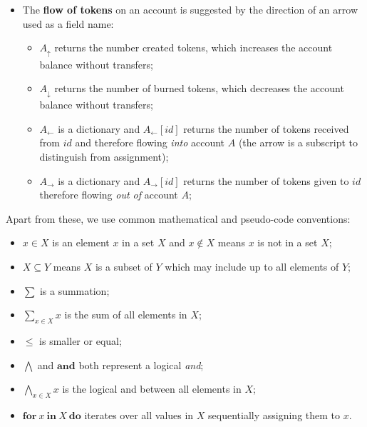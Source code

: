 \documentclass[9pt, oneside]{article}   	%
\begin{document}
\begin{itemize}
	\item The  \textbf{flow of tokens} on an account is suggested by the direction of an arrow used as a field name: 
		\begin{itemize}
			\item $A_\uparrow$ returns the number created tokens, which increases the account balance without transfers;
			\item $A_\downarrow$ returns the number of burned tokens, which decreases the account balance without transfers;
			\item $A_{\leftarrow}$ is a dictionary and $A_{\leftarrow}[id]$ returns the number of tokens received from $id$ and therefore flowing \textit{into} account $A$ (the arrow is a subscript to distinguish from assignment);
			\item $A_{\rightarrow}$ is a dictionary and $A_{\rightarrow}[id]$ returns the number of tokens given to $id$ therefore flowing \textit{out of} account $A$;
		\end{itemize}
\end{itemize}

Apart from these, we use common mathematical and pseudo-code conventions: 
\begin{itemize}
	\item $x \in X$ is an element $x$ in a set $X$ and $x \notin X$ means $x$ is not in a set $X$;
	\item $X \subseteq Y$ means $X$ is a subset of $Y$ which may include up to all elements of $Y$;
	 \item $\sum$ is a summation;
	 \item $\sum\limits_{x \in X} x$ is the sum of all elements in $X$;
	 \item $\leq$ is smaller or equal;
	 \item $\bigwedge$ and $\textbf{and}$ both represent a logical \textit{and};
	 \item $\bigwedge\limits_{x \in X} x$ is the logical and between all elements in $X$;
	 \item $\textbf{for}~x ~\textbf{in}~ X~\textbf{do}$ iterates over all values in $X$ sequentially assigning them to $x$.
\end{itemize}
\end{document}
